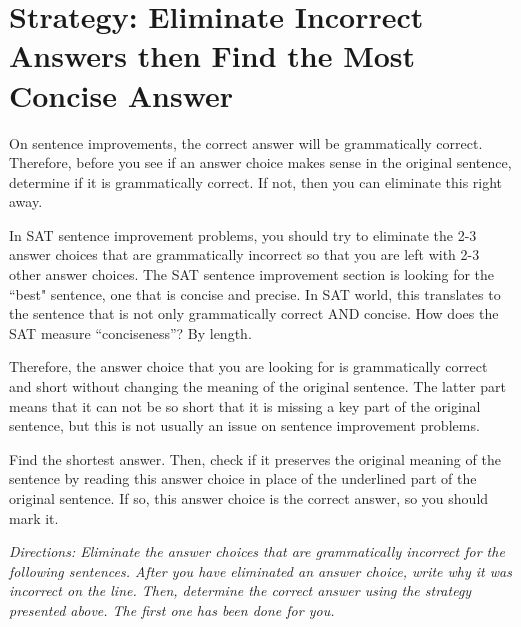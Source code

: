 \section{\sloppy Strategy: Eliminate Incorrect Answers then Find the Most Concise Answer}

On sentence improvements, the correct answer will be grammatically correct. Therefore, before
you see if an answer choice makes sense in the original sentence, determine if it is grammatically
correct. If not, then you can eliminate this right away.

\bigskip
In SAT sentence improvement problems, you should try to eliminate the 2-3 answer choices that are grammatically incorrect so that you are left with 2-3 other answer choices. The SAT sentence improvement section is looking for the ``best" sentence, one that is concise and precise. In SAT world, this translates to the sentence that is not only grammatically correct AND concise. How does the SAT measure ``conciseness''? By length.

\bigskip
Therefore, the answer choice that you are looking for is grammatically correct and short without changing the meaning of the original sentence. The latter part means that it can not be so short that it is missing a key part of the original sentence,
but this is not usually an issue on sentence improvement problems.

\bigskip
Find the shortest answer. Then, check if it preserves the original meaning of the sentence by reading this answer choice in place of the underlined part of the original sentence. If so, this answer choice is the correct answer, so you should mark it.

\bigskip
\textit{Directions: Eliminate the answer choices that are grammatically incorrect for the following sentences. After you have eliminated an answer choice, write why it was incorrect on the line. Then, determine the correct answer using the strategy presented above. The first one has been done for you.}

